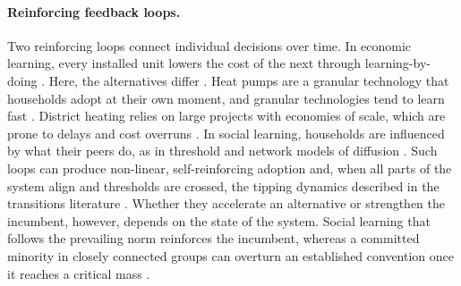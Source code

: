 \documentclass[preprint,12pt,authoryear]{elsarticle}
\begin{document}
\paragraph{Reinforcing feedback loops.}
Two reinforcing loops connect individual decisions over time. In economic
learning, every installed unit lowers the cost of the next through
learning-by-doing 
\citep{arthurCompetingTechnologiesIncreasing1989}. Here, the alternatives
differ \citep{loomansExploringTradeoffsDecisionsupport2024}. Heat pumps are a
granular technology that households adopt at their own moment, and granular
technologies tend to learn fast
\citep{wilsonGranularTechnologiesAccelerate2020}. District heating relies on
large projects with economies of scale, which are prone to delays and cost
overruns \citep{flyvbjergHowBigThings2023}. In social learning, households
are influenced by what their peers do, as in threshold and network models of
diffusion \citep{granovetterThresholdModelsCollective1978,
wattsSimpleModelGlobal2002,centolaComplexContagionsWeakness2007}. Such loops
can produce non-linear, self-reinforcing adoption and, when all parts of the
system align and thresholds are crossed, the tipping dynamics described in
the transitions literature
\citep{geelsSociotechnicalTransitionPerspective2023,
lentonOperationalisingPositiveTipping2022/ed}. Whether they accelerate an
alternative or strengthen the incumbent, however, depends on the state of the
system. Social learning that follows the prevailing norm reinforces the
incumbent, whereas a committed minority in closely connected groups can
overturn an established convention once it reaches a critical mass
\citep{centolaComplexContagionsWeakness2007,
centolaExperimentalEvidenceTipping2018}.
\end{document}
